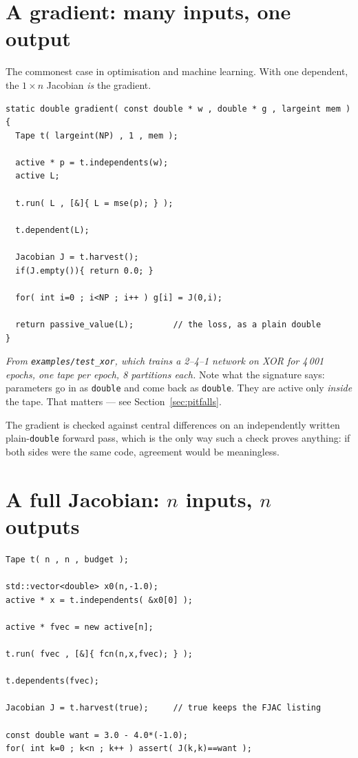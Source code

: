 \documentclass[11pt,a4paper]{report}
\newcommand{\code}[1]{\texttt{#1}}
\begin{document}
\section{A gradient: many inputs, one output}

The commonest case in optimisation and machine learning. With one dependent,
the $1\times n$ Jacobian \emph{is} the gradient.

\begin{lstlisting}
static double gradient( const double * w , double * g , largeint mem )
{
  Tape t( largeint(NP) , 1 , mem );

  active * p = t.independents(w);
  active L;

  t.run( L , [&]{ L = mse(p); } );

  t.dependent(L);

  Jacobian J = t.harvest();
  if(J.empty()){ return 0.0; }

  for( int i=0 ; i<NP ; i++ ) g[i] = J(0,i);

  return passive_value(L);        // the loss, as a plain double
}
\end{lstlisting}

\noindent
\emph{From \code{examples/test\_xor}, which trains a 2--4--1 network on XOR for
4\,001 epochs, one tape per epoch, 8 partitions each.} Note what the signature
says: parameters go in as \code{double} and come back as \code{double}. They are
active only \emph{inside} the tape. That matters --- see
Section~\ref{sec:pitfalls}.

The gradient is checked against central differences on an independently written
plain-\code{double} forward pass, which is the only way such a check proves
anything: if both sides were the same code, agreement would be meaningless.

\section{A full Jacobian: $n$ inputs, $n$ outputs}

\begin{lstlisting}
Tape t( n , n , budget );

std::vector<double> x0(n,-1.0);
active * x = t.independents( &x0[0] );

active * fvec = new active[n];

t.run( fvec , [&]{ fcn(n,x,fvec); } );

t.dependents(fvec);

Jacobian J = t.harvest(true);     // true keeps the FJAC listing

const double want = 3.0 - 4.0*(-1.0);
for( int k=0 ; k<n ; k++ ) assert( J(k,k)==want );
\end{lstlisting}
\end{document}
